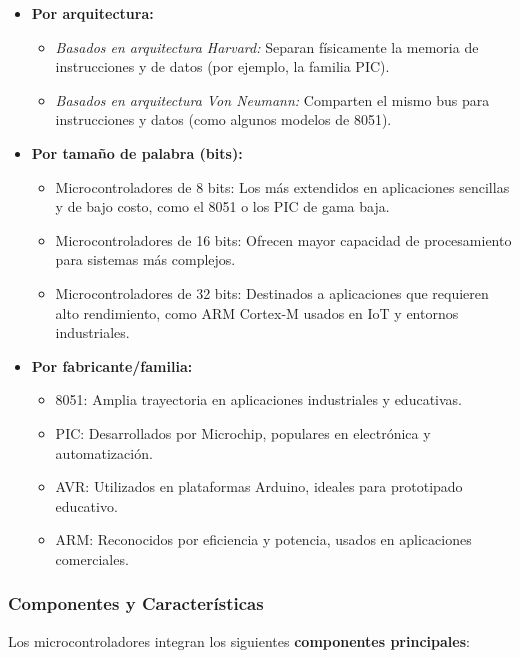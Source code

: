 \documentclass[a4paper,12pt]{article}
\begin{document}
	\begin{itemize}
		\item \textbf{Por arquitectura:}
		\begin{itemize}
			\item \textit{Basados en arquitectura Harvard:} Separan físicamente la memoria de instrucciones y de datos (por ejemplo, la familia PIC).
			\item \textit{Basados en arquitectura Von Neumann:} Comparten el mismo bus para instrucciones y datos (como algunos modelos de 8051).
		\end{itemize}
		\item \textbf{Por tamaño de palabra (bits):}
		\begin{itemize}
			\item Microcontroladores de 8 bits: Los más extendidos en aplicaciones sencillas y de bajo costo, como el 8051 o los PIC de gama baja.
			\item Microcontroladores de 16 bits: Ofrecen mayor capacidad de procesamiento para sistemas más complejos.
			\item Microcontroladores de 32 bits: Destinados a aplicaciones que requieren alto rendimiento, como ARM Cortex-M usados en IoT y entornos industriales.
		\end{itemize}
		\item \textbf{Por fabricante/familia:}
		\begin{itemize}
			\item 8051: Amplia trayectoria en aplicaciones industriales y educativas.
			\item PIC: Desarrollados por Microchip, populares en electrónica y automatización.
			\item AVR: Utilizados en plataformas Arduino, ideales para prototipado educativo.
			\item ARM: Reconocidos por eficiencia y potencia, usados en aplicaciones comerciales.
		\end{itemize}
	\end{itemize}
	
	\subsubsection{Componentes y Características}
	Los microcontroladores integran los siguientes \textbf{componentes principales}:
	
\end{document}
